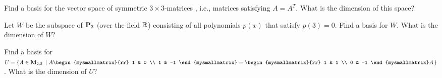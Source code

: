\begin{ex}
  Find a basis for the vector space of symmetric $3\times 3$-matrices%
  , i.e., matrices satisfying $A=A^{T}$.
  What is the dimension of this space?
\end{ex}

\begin{ex}
  Let $W$ be the subspace of $\mathbf{P}_3$ (over the field $\mathbb{R}$)
  consisting of all polynomials $p(x)$ that satisfy $p(3)=0$.
  Find a basis for $W$. What is the dimension of $W$?
\end{ex}

\begin{ex}
  Find a basis for
  $U=\set{ A\in\Mat_{2,2} ~\left\vert~ A\begin{mysmallmatrix}{rr} 1 &
        0 \\ 1 & -1 \end{mysmallmatrix} = \begin{mysmallmatrix}{rr} 1
        & 1 \\ 0 & -1 \end{mysmallmatrix} A \right.}$.  What is the
  dimension of $U$?
\end{ex}

